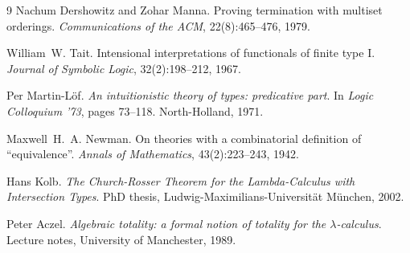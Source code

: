 \begin{thebibliography}{9}
  Nachum Dershowitz and Zohar Manna.
  Proving termination with multiset orderings.
  \emph{Communications of the ACM}, 22(8):465--476, 1979.

  William~W. Tait.
  Intensional interpretations of functionals of finite type I.
  \emph{Journal of Symbolic Logic}, 32(2):198--212, 1967.

  Per Martin-L\"of.
  \emph{An intuitionistic theory of types: predicative part}.
  In \emph{Logic Colloquium '73}, pages 73--118. North-Holland, 1971.

  Maxwell~H.~A. Newman.
  On theories with a combinatorial definition of ``equivalence''.
  \emph{Annals of Mathematics}, 43(2):223--243, 1942.

  Hans Kolb.
  \emph{The Church-Rosser Theorem for the Lambda-Calculus with
  Intersection Types}.
  PhD thesis, Ludwig-Maximilians-Universit\"at M\"unchen, 2002.

  Peter Aczel.
  \emph{Algebraic totality: a formal notion of totality for the
  $\lambda$-calculus}.
  Lecture notes, University of Manchester, 1989.
\end{thebibliography}

